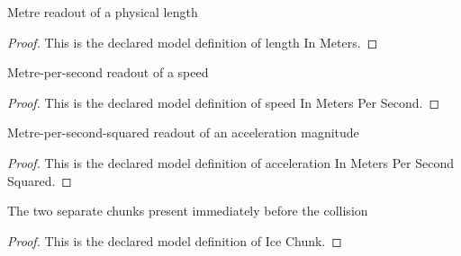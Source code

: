 \begin{definition}
  \label{def:physics:phyx-mini-0764:phyxminiproblems-problemphyxmini0764-lengthinmeters}
  Metre readout of a physical length
\end{definition}
\begin{proof}
  This is the declared model definition of length In Meters.
\end{proof}
\begin{definition}
  \label{def:physics:phyx-mini-0764:phyxminiproblems-problemphyxmini0764-speedinmeterspersecond}
  Metre-per-second readout of a speed
\end{definition}
\begin{proof}
  This is the declared model definition of speed In Meters Per Second.
\end{proof}
\begin{definition}
  \label{def:physics:phyx-mini-0764:phyxminiproblems-problemphyxmini0764-accelerationinmeterspersecondsquared}
  Metre-per-second-squared readout of an acceleration magnitude
\end{definition}
\begin{proof}
  This is the declared model definition of acceleration In Meters Per Second Squared.
\end{proof}
\begin{definition}
  \label{def:physics:phyx-mini-0764:phyxminiproblems-problemphyxmini0764-icechunk}
  The two separate chunks present immediately before the collision
\end{definition}
\begin{proof}
  This is the declared model definition of Ice Chunk.
\end{proof}
